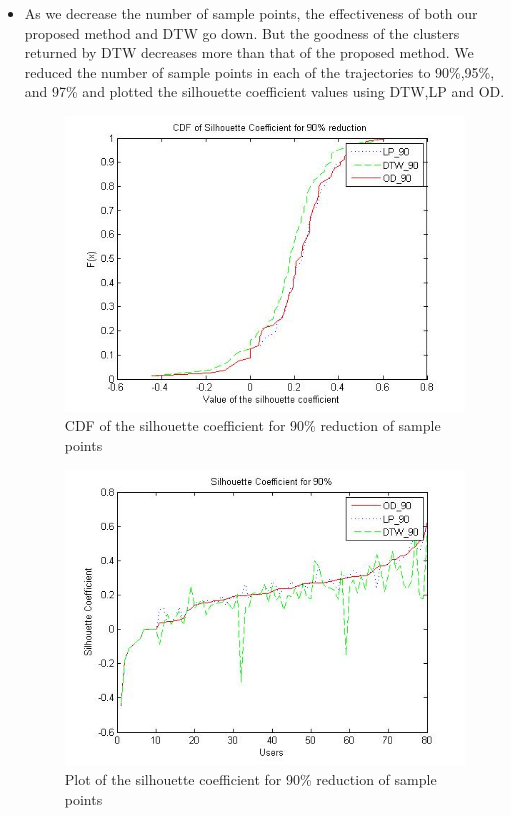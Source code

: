 \begin{itemize}
\item
As we decrease the number of sample points, the effectiveness of both our proposed method and DTW go down. But the goodness of the clusters returned by DTW decreases more than that of the proposed method. We reduced the number of sample points in each of the trajectories to 90\%,95\%, and 97\% and plotted the silhouette coefficient values using DTW,LP and OD. 

\begin{figure}
\centering     
\includegraphics[scale=0.3]{figs/noise_90_cdf.jpg}
\caption{CDF of the silhouette coefficient for 90\% reduction of sample points }
\label{fig:noise_90_cdf}  
\end{figure}

\begin{figure}
\centering     
\includegraphics[scale=0.3]{figs/noise_90_sil.jpg}
\caption{Plot of the silhouette coefficient for 90\% reduction of sample points }
\label{fig:noise_90_sil}  
\end{figure}


\end{itemize}
